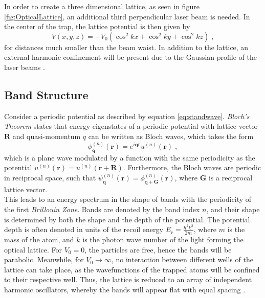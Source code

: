 In order to create a three dimensional lattice, as seen in figure \ref{fig:OpticalLattice}, an additional third perpendicular laser beam is needed. In the center of the trap, the lattice potential is then given by
\begin{equation}
	V(x,y,z) = - V_0 \left( \cos^2{k x } + \cos^2{k y } + \cos^2{k z } \right) \; , \label{eq:3Dlattice}
\end{equation}
for distances much smaller than the beam waist. In addition to the lattice, an external harmonic confinement will be present due to the Gaussian profile of the laser beams \cite{manybodyBloch}.

\subsection{Band Structure}
Consider a periodic potential as described by equation \eqref{eq:standwave}. \textit{Bloch's Theorem} states that energy eigenstates of a periodic potential with lattice vector $\boldsymbol{R}$ and quasi-momentum $q$ can be written as Bloch waves, which takes the form
\begin{equation}
	\phi_{\boldsymbol{q}}^{(n)}(\boldsymbol{r}) = e^{i \boldsymbol{q} \boldsymbol{r}} u^{(n)}(\boldsymbol{r}) \; ,
\end{equation}
which is a plane wave modulated by a function with the same periodicity as the potential $u^{(n)}(\boldsymbol{r}) = u^{(n)}(\boldsymbol{r} + \boldsymbol{R})$. Furthermore, the Bloch waves are periodic in reciprocal space, such that $\psi_{\boldsymbol{q}}^{(n)}(\boldsymbol{r}) = \phi_{\boldsymbol{q} + \boldsymbol{G}}^{(n)}(\boldsymbol{r})$, where $\boldsymbol{G}$ is a reciprocal lattice vector. \cite{kittel} \\
This leads to an energy spectrum in the shape of bands with the periodicity of the first \textit{Brillouin Zone}. Bands are denoted by the band index $n$, and their shape is determined by both the shape and the depth of the potential. The potential depth is often denoted in units of the recoil energy $E_r = \frac{\hbar ^2 k^2}{2 m}$, where $m$ is the mass of the atom, and $k$ is the photon wave number of the light forming the optical lattice. For $V_0 = 0$, the particles are free, hence the bands will be parabolic. Meanwhile, for $V_0 \rightarrow \infty$, no interaction between different wells of the lattice can take place, as the wavefunctions of the trapped atoms will be confined to their respective well. Thus, the lattice is reduced to an array of independent harmonic oscillators, whereby the bands will appear flat with equal spacing \cite{greiner}. 

